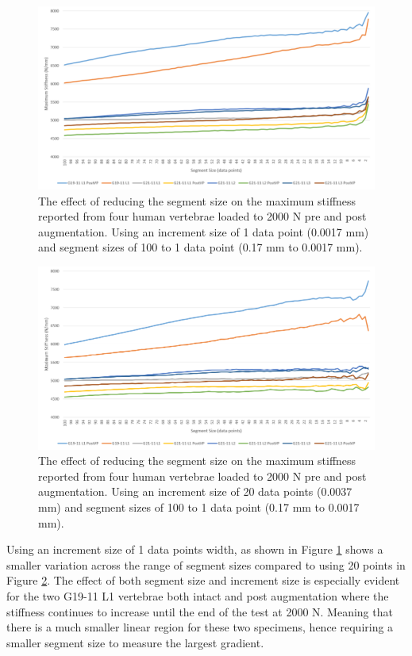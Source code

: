 \begin{figure}[ht!]
\centering
\includegraphics[width=6in]{Chapters/Chapter_HT_images/findStiffness_1incr.png}
\caption{The effect of reducing the segment size on the maximum stiffness reported from four human vertebrae loaded to 2000 N pre and post augmentation. Using an increment size of 1 data point (0.0017 mm) and segment sizes of 100 to 1 data point (0.17 mm to 0.0017 mm).}
\label{fig:findStiffness_1incr}
\end{figure}

\begin{figure}[ht!]
\centering
\includegraphics[width=6in]{Chapters/Chapter_HT_images/findStiffness_20incr.png}
\caption{The effect of reducing the segment size on the maximum stiffness reported from four human vertebrae loaded to 2000 N pre and post augmentation. Using an increment size of 20 data points (0.0037 mm) and segment sizes of 100 to 1 data point (0.17 mm to 0.0017 mm).}
\label{fig:findStiffness_20incr}
\end{figure}

Using an increment size of 1 data points width, as shown in Figure \ref{fig:findStiffness_1incr} shows a smaller variation across the range of segment sizes compared to using 20 points in Figure \ref{fig:findStiffness_20incr}.
The effect of both segment size and increment size is especially evident for the two G19-11 L1 vertebrae both intact and post augmentation where the stiffness continues to increase until the end of the test at 2000 N.
Meaning that there is a much smaller linear region for these two specimens, hence requiring a smaller segment size to measure the largest gradient.

